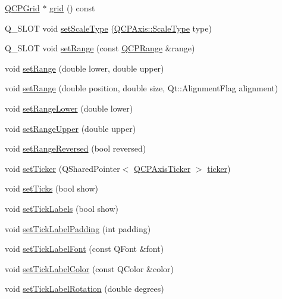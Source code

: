 \begin{DoxyCompactItemize}
\item 
\hyperlink{class_q_c_p_grid}{Q\+C\+P\+Grid} $\ast$ \hyperlink{class_q_c_p_axis_ac4fb913cce3072b5e75a4635e0f6cd04}{grid} () const 
\item 
Q\+\_\+\+S\+L\+OT void \hyperlink{class_q_c_p_axis_adef29cae617af4f519f6c40d1a866ca6}{set\+Scale\+Type} (\hyperlink{class_q_c_p_axis_a36d8e8658dbaa179bf2aeb973db2d6f0}{Q\+C\+P\+Axis\+::\+Scale\+Type} type)
\item 
Q\+\_\+\+S\+L\+OT void \hyperlink{class_q_c_p_axis_aebdfea5d44c3a0ad2b4700cd4d25b641}{set\+Range} (const \hyperlink{class_q_c_p_range}{Q\+C\+P\+Range} \&range)
\item 
void \hyperlink{class_q_c_p_axis_a57d6ee9e9009fe88cb19db476ec70bca}{set\+Range} (double lower, double upper)
\item 
void \hyperlink{class_q_c_p_axis_acf60e5b2d631fbc8c4548c3d579cb6d0}{set\+Range} (double position, double size, Qt\+::\+Alignment\+Flag alignment)
\item 
void \hyperlink{class_q_c_p_axis_afcf51227d337db28d1a9ce9a4d1bc91a}{set\+Range\+Lower} (double lower)
\item 
void \hyperlink{class_q_c_p_axis_acd3ca1247aa867b540cd5ec30ccd3bef}{set\+Range\+Upper} (double upper)
\item 
void \hyperlink{class_q_c_p_axis_a2172fdb196b1a0dc3f40992fcad8e9e1}{set\+Range\+Reversed} (bool reversed)
\item 
void \hyperlink{class_q_c_p_axis_a4ee03fcd2c74d05cd1a419b9af5cfbdc}{set\+Ticker} (Q\+Shared\+Pointer$<$ \hyperlink{class_q_c_p_axis_ticker}{Q\+C\+P\+Axis\+Ticker} $>$ \hyperlink{class_q_c_p_axis_acdd672979a52b1f31e2da3518c92616d}{ticker})
\item 
void \hyperlink{class_q_c_p_axis_ac891409315bc379e3b1abdb162c1a011}{set\+Ticks} (bool show)
\item 
void \hyperlink{class_q_c_p_axis_a04ba16e1f6f78d70f938519576ed32c8}{set\+Tick\+Labels} (bool show)
\item 
void \hyperlink{class_q_c_p_axis_af302c479af9dbc2e9f0e44e07c0012ee}{set\+Tick\+Label\+Padding} (int padding)
\item 
void \hyperlink{class_q_c_p_axis_a2b8690c4e8dbc39d9185d2b398ce7a6c}{set\+Tick\+Label\+Font} (const Q\+Font \&font)
\item 
void \hyperlink{class_q_c_p_axis_a395e445c3fe496b935bee7b911ecfd1c}{set\+Tick\+Label\+Color} (const Q\+Color \&color)
\item 
void \hyperlink{class_q_c_p_axis_a1bddd4413df8a576b7ad4b067fb33375}{set\+Tick\+Label\+Rotation} (double degrees)

\end{DoxyCompactItemize}
